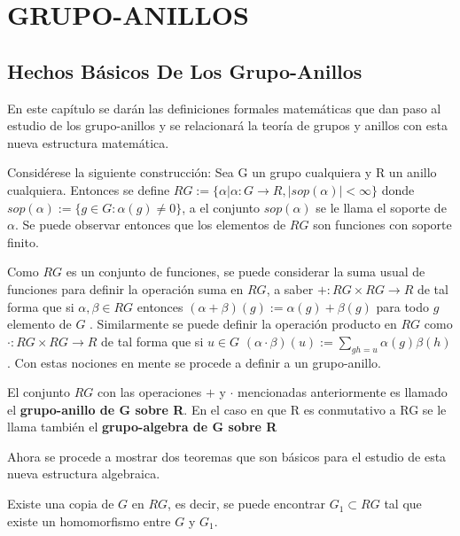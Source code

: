 \chapter{\quad GRUPO-ANILLOS}

\section{\quad Hechos Básicos De Los Grupo-Anillos}
En este capítulo se darán las definiciones formales matemáticas que dan paso al estudio de los grupo-anillos y se relacionará la teoría de grupos y anillos con esta nueva estructura matemática.

Considérese la siguiente construcción: Sea G un grupo cualquiera y R un anillo cualquiera. Entonces se define $RG:=\{\alpha | \alpha \colon  G \to R , |sop(\alpha)|< \infty \}$ donde $sop(\alpha):=\{g \in G: \alpha (g)\neq 0\}$, a el conjunto $sop(\alpha)$ se le llama el soporte de $\alpha$. Se puede observar entonces que los elementos de $RG$ son funciones con soporte finito. 


Como $RG$ es un conjunto de funciones, se puede considerar la suma usual de funciones para definir la operación suma en $RG$, a saber $+ \colon RG\times RG \to R $ de tal forma que si $\alpha, \beta \in RG$ entonces $(\alpha +\beta)(g):=\alpha(g)+\beta(g)$ para todo $g$ elemento de $G$ . Similarmente se puede definir la operación producto en $RG$ como $\cdot \colon RG \times RG \to R$ de tal forma que si $u\in G$ $(\alpha \cdot \beta )(u):= \sum_{gh=u}\alpha(g)\beta(h) $. Con estas nociones en mente   se procede a definir a un grupo-anillo. 
\begin{definicion}
El conjunto $RG$ con las operaciones $+$ y $\cdot$ mencionadas anteriormente es llamado el \textbf{grupo-anillo de G sobre R}. En el caso en que R es conmutativo a RG se le llama también el \textbf{grupo-algebra de G sobre R} 
\end{definicion}

Ahora se procede a mostrar dos teoremas que son básicos para el estudio de esta nueva estructura algebraica.

\begin{teorema}\label{inmersion}
Existe una copia de $G$ en $RG$, es decir, se puede encontrar $G_1 \subset RG$ tal que existe  un homomorfismo entre $G$ y $G_1$.  
\end{teorema}

